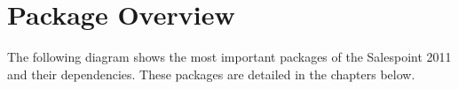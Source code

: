 \section{Package Overview}
The following diagram shows the most important packages of the Salespoint 2011 and their dependencies. These packages are detailed in the chapters below.

